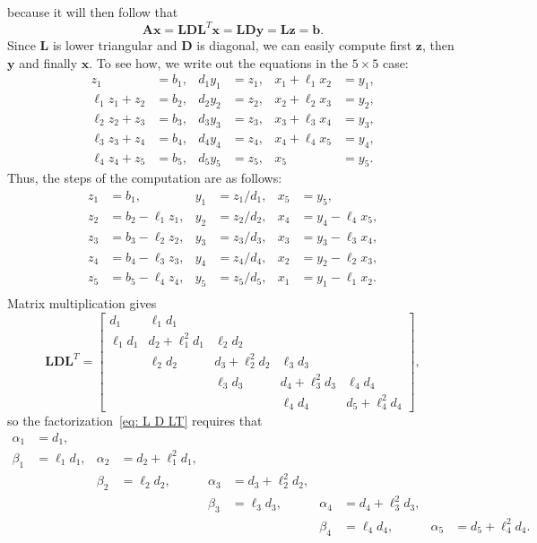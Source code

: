 because it will then follow that
\[
\boldsymbol{A}\boldsymbol{x}
    =\boldsymbol{L}\boldsymbol{D}\boldsymbol{L}^T\boldsymbol{x}
    =\boldsymbol{L}\boldsymbol{D}\boldsymbol{y}
    =\boldsymbol{L}\boldsymbol{z}=\boldsymbol{b}.
\]
Since $\boldsymbol{L}$ is lower triangular and $\boldsymbol{D}$ is diagonal,
we can easily compute first $\boldsymbol{z}$, then $\boldsymbol{y}$ and finally 
$\boldsymbol{x}$.  To see how, we write out the equations in the $5\times5$ 
case:
\begin{align*}
      z_1    &=b_1,& d_1y_1&=z_1,& x_1+\ell_1 x_2&=y_1,\\
\ell_1z_1+z_2&=b_2,& d_2y_2&=z_2,& x_2+\ell_2 x_3&=y_2,\\
\ell_2z_2+z_3&=b_3,& d_3y_3&=z_3,& x_3+\ell_3 x_4&=y_3,\\
\ell_3z_3+z_4&=b_4,& d_4y_4&=z_4,& x_4+\ell_4 x_5&=y_4,\\
\ell_4z_4+z_5&=b_5,& d_5y_5&=z_5,& x_5           &=y_5.
\end{align*}
Thus, the steps of the computation are as follows:
\begin{align*}
z_1&=b_1,           & y_1&=z_1/d_1,& x_5&=y_5,\\
z_2&=b_2-\ell_1 z_1,& y_2&=z_2/d_2,& x_4&=y_4-\ell_4x_5,\\
z_3&=b_3-\ell_2 z_2,& y_3&=z_3/d_3,& x_3&=y_3-\ell_3x_4,\\
z_4&=b_4-\ell_3 z_3,& y_4&=z_4/d_4,& x_2&=y_2-\ell_2x_3,\\
z_5&=b_5-\ell_4 z_4,& y_5&=z_5/d_5,& x_1&=y_1-\ell_1x_2.\\
\end{align*}
Matrix multiplication gives
\[
\boldsymbol{L}\boldsymbol{D}\boldsymbol{L}^T=\begin{bmatrix}
      d_1&      \ell_1d_1&               &               &         \\
\ell_1d_1&d_2+\ell_1^2d_1&      \ell_2d_2&               &         \\
         &      \ell_2d_2&d_3+\ell_2^2d_2&      \ell_3d_3&         \\
         &               &      \ell_3d_3&d_4+\ell_3^2d_3&\ell_4d_4\\
         &               &               &      \ell_4d_4&d_5+\ell_4^2d_4
\end{bmatrix},
\]
so the factorization~\eqref{eq: L D LT} requires that
\begin{align*}
     \alpha_1&=d_1,      &        &                 &&&&&&\\
      \beta_1&=\ell_1d_1,&\alpha_2&=d_2+\ell_1^2d_1,&&&&&&\\
    &&\beta_2&=\ell_2d_2,&\alpha_3&=d_3+\ell_2^2d_2,&&&&\\
  &&&&\beta_3&=\ell_3d_3,&\alpha_4&=d_4+\ell_3^2d_3,&&\\
&&&&&&\beta_4&=\ell_4d_4,&\alpha_5&=d_5+\ell_4^2d_4.
\end{align*}
